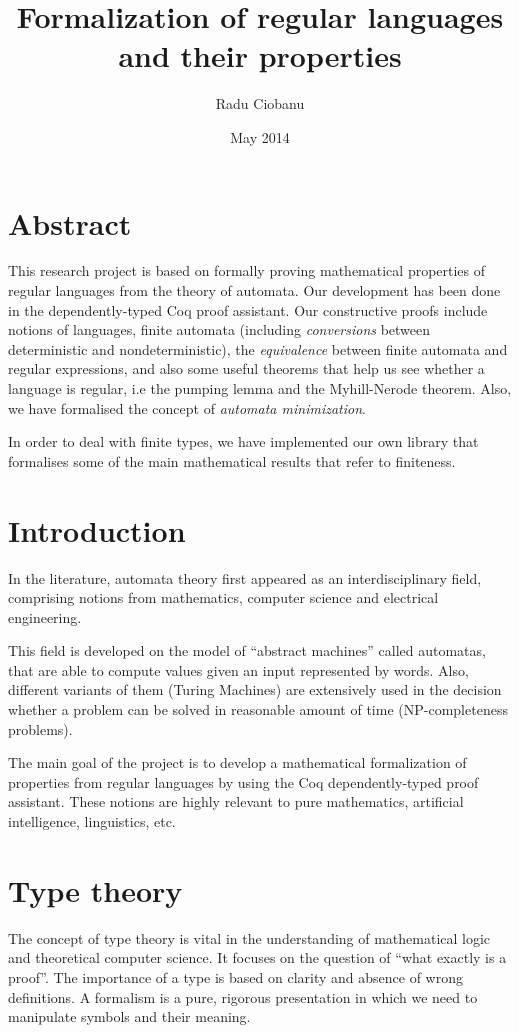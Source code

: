 \documentclass[a4paper,12pt]{book}
\begin{document}
\author{Radu Ciobanu}


\title{Formalization of regular languages and their properties}
\date{May 2014}

\frontmatter
\maketitle
\chapter*{Abstract}
This research project is based on formally proving mathematical properties of regular languages from the theory of automata. Our development has been done in the dependently-typed Coq proof assistant. Our constructive proofs include notions of languages, finite automata (including \textit{conversions} between deterministic and nondeterministic),  the \textit{equivalence} between finite automata and regular expressions, and also some useful theorems that help us see whether a language is regular, i.e the pumping lemma and the Myhill-Nerode theorem. Also, we have formalised the concept of \textit{automata minimization}.

In order to deal with finite types, we have implemented our own library that formalises some of the main mathematical results that refer to finiteness. 
\tableofcontents
\chapter{ Introduction}
In the literature, automata theory first appeared as an interdisciplinary field, comprising notions from mathematics, computer science and electrical engineering. 

This field is developed on the model of “abstract machines” called automatas, that are able to compute values given an input represented by words. Also, different variants of them (Turing Machines) are extensively used in the decision whether a problem can be solved in reasonable amount of time (NP-completeness problems).

The main goal of the project is to develop a mathematical formalization of properties from regular languages by using the Coq dependently-typed proof assistant. These notions are highly relevant to pure mathematics, artificial intelligence, linguistics, etc.
\chapter{Type theory}
The concept of type theory is vital in the understanding of mathematical logic and theoretical computer science. It focuses on the question of “what exactly is a proof”. The importance of a type is based on clarity and absence of wrong definitions. A formalism is a pure, rigorous presentation in which we need to manipulate symbols and their meaning.
\end{document}
